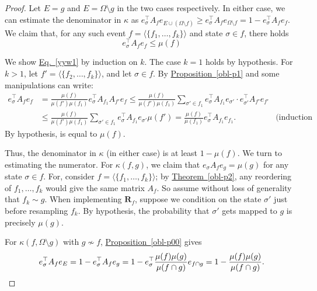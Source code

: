 \documentclass[11pt]{article}
\newcommand{\expref}[2]{\texorpdfstring{\hyperref[#2]{#1~\ref{#2}}}{#1~\ref{#2}}}
\newcommand{\expeqref}[2]{\texorpdfstring{\hyperref[#2]{#1~\eqref{#2}}}{#1~\eqref{#2}}}
\begin{document}
\begin{proof}
Let $E = g$ and $E = \Omega \setminus g$ in the two cases respectively.  In either case, we can estimate the denominator in $\kappa$ as $e_{\sigma}^{\top} A_f e_{E \cup (\Omega \setminus f)} \geq  e_{\sigma}^{\top} A_f e_{\Omega \setminus f} = 1 - e_{\sigma}^{\top} A_f e_f$. We claim that, for any such event $f = \langle \{f_1, \dots, f_k \} \rangle$ and state $\sigma \in f$, there holds
\begin{equation}
\label{yyw1}
e_{\sigma}^{\top} A_f e_f \leq \mu(f)
\end{equation}

We show \expeqref{Eq.}{yyw1} by induction on $k$. The case $k = 1$ holds by hypothesis.  For $k>1$, let $f' = \langle\{ f_2, \dots, f_k \} \rangle$, and let $\sigma \in f$. By \expref{Proposition}{obl-p1} and some manipulations  can write:
\begin{align*}
e_{\sigma}^{\top} A_f e_f &=  \frac{\mu(f)}{\mu(f') \mu(f_1)} e_{\sigma}^{\top} A_{f_1} A_{f'}  e_{f}   \leq \frac{\mu(f)}{\mu(f') \mu(f_1)} \sum_{\sigma' \in f_1} e_{\sigma}^{\top} A_{f_1} e_{\sigma'} \cdot  e_{\sigma'}^{\top} A_{f'} e_{f'}  \\
& \leq \frac{\mu(f)}{\mu(f') \mu(f_1)} \sum_{\sigma' \in f_1} e_{\sigma}^{\top} A_{f_1} e_{\sigma'} \mu(f') =\frac{\mu(f)}{\mu(f_1)}   e_{\sigma}^{\top} A_{f_1}e_{f_1}.  & \text{(induction hypothesis)}
\end{align*}
By hypothesis, is equal to $\mu(f)$.

Thus, the denominator in $\kappa$ (in either case) is at least $1 - \mu(f)$. We turn to estimating the numerator. For $\kappa(f,g)$, we claim that $e_{\sigma} A_f e_g = \mu(g)$ for any state $\sigma \in f$. For, consider $f = \langle \{ f_1, \dots, f_k \} \rangle$; by \expref{Theorem}{obl-p2}, any reordering of $f_1, \dots, f_k$ would give the same matrix $A_f$.  So assume without loss of generality that $f_k \sim g$. When implementing $\mathbf R_f$, suppose we condition on the state $\sigma'$ just before resampling $f_k$. By hypothesis, the probability that $\sigma'$ gets mapped to $g$ is precisely $\mu(g)$. 


For $\kappa(f, \Omega \setminus g)$ with $g \not \sim f$, \expref{Proposition}{obl-p00} gives \[
e_{\sigma}^{\top} A_f e_E = 1 - e_{\sigma}^{\top} A_f e_g = 1 - e_{\sigma}^{\top} \frac{\mu(f) \mu(g)}{\mu(f \cap g)} e_{f \cap g} = 1 -\frac{\mu(f) \mu(g)}{\mu(f \cap g)}. \qedhere \]
\end{proof}
\end{document}
